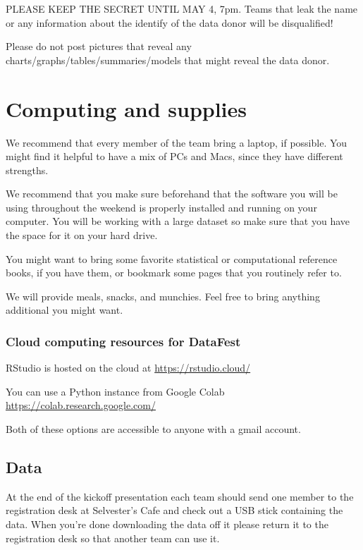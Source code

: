 \documentclass[]{article}
\begin{document}
PLEASE KEEP THE SECRET UNTIL MAY 4, 7pm. Teams that leak the name or any
information about the identify of the data donor will be disqualified!

Please do not post pictures that reveal any
charts/graphs/tables/summaries/models that might reveal the data donor.

\hypertarget{computing-and-supplies}{%
\section{Computing and supplies}\label{computing-and-supplies}}

We recommend that every member of the team bring a laptop, if possible.
You might find it helpful to have a mix of PCs and Macs, since they have
different strengths.

We recommend that you make sure beforehand that the software you will be
using throughout the weekend is properly installed and running on your
computer. You will be working with a large dataset so make sure that you
have the space for it on your hard drive.

You might want to bring some favorite statistical or computational
reference books, if you have them, or bookmark some pages that you
routinely refer to.

We will provide meals, snacks, and munchies. Feel free to bring anything
additional you might want.

\hypertarget{cloud-computing-resources-for-datafest}{%
\subsubsection{Cloud computing resources for
DataFest}\label{cloud-computing-resources-for-datafest}}

RStudio is hosted on the cloud at \url{https://rstudio.cloud/}

You can use a Python instance from Google Colab
\url{https://colab.research.google.com/}

Both of these options are accessible to anyone with a gmail account.

\hypertarget{data}{%
\subsection{Data}\label{data}}

At the end of the kickoff presentation each team should send one member
to the registration desk at Selvester's Cafe and check out a USB stick
containing the data. When you're done downloading the data off it please
return it to the registration desk so that another team can use it.
\end{document}
